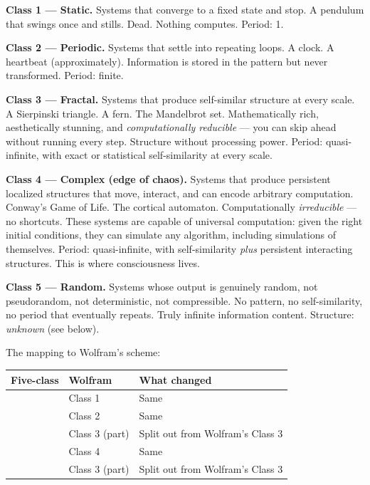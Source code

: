 \documentclass[11pt, twoside, openright]{book}
\begin{document}
\textbf{Class 1 --- Static.} Systems that converge to a fixed state and stop. A pendulum that swings once and stills. Dead. Nothing computes. Period: 1.

\textbf{Class 2 --- Periodic.} Systems that settle into repeating loops. A clock. A heartbeat (approximately). Information is stored in the pattern but never transformed. Period: finite.

\textbf{Class 3 --- Fractal.} Systems that produce self-similar structure at every scale. A Sierpinski triangle. A fern. The Mandelbrot set. Mathematically rich, aesthetically stunning, and \textit{computationally reducible} --- you can skip ahead without running every step. Structure without processing power. Period: quasi-infinite, with exact or statistical self-similarity at every scale.

\textbf{Class 4 --- Complex (edge of chaos).} Systems that produce persistent localized structures that move, interact, and can encode arbitrary computation. Conway's Game of Life. The cortical automaton. Computationally \textit{irreducible} --- no shortcuts. These systems are capable of universal computation: given the right initial conditions, they can simulate any algorithm, including simulations of themselves. Period: quasi-infinite, with self-similarity \textit{plus} persistent interacting structures. This is where consciousness lives.

\textbf{Class 5 --- Random.} Systems whose output is genuinely random, not pseudorandom, not deterministic, not compressible. No pattern, no self-similarity, no period that eventually repeats. Truly infinite information content. Structure: \textit{unknown} (see below).

The mapping to Wolfram's scheme:


{\footnotesize
\noindent
\begin{tabularx}{\linewidth}{>{\centering\arraybackslash}X >{\centering\arraybackslash}X X}
\toprule
\textbf{Five-class} & \textbf{Wolfram} & \textbf{What changed} \\
\midrule
1 & Class 1 & Same \\[4pt]
2 & Class 2 & Same \\[4pt]
3 & Class 3 (part) & Split out from Wolfram's Class 3 \\[4pt]
4 & Class 4 & Same \\[4pt]
5 & Class 3 (part) & Split out from Wolfram's Class 3 \\[4pt]
\bottomrule
\end{tabularx}
}
\end{document}
